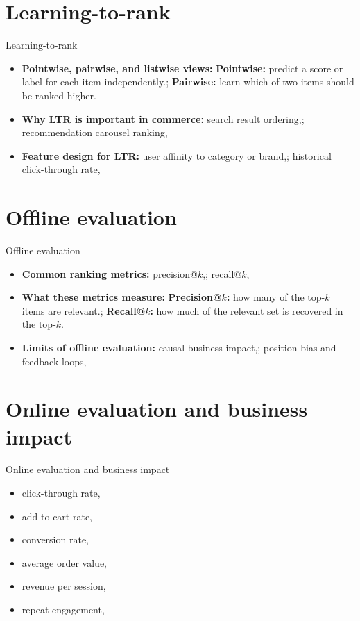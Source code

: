 \documentclass[aspectratio=169]{beamer}
\begin{document}
\section{Learning-to-rank}

\begin{frame}{Learning-to-rank}
  \begin{itemize}
    \item \textbf{Pointwise, pairwise, and listwise views:} \textbf{Pointwise:} predict a score or label for each item independently.; \textbf{Pairwise:} learn which of two items should be ranked higher.
    \item \textbf{Why LTR is important in commerce:} search result ordering,; recommendation carousel ranking,
    \item \textbf{Feature design for LTR:} user affinity to category or brand,; historical click-through rate,
  \end{itemize}
\end{frame}

\section{Offline evaluation}

\begin{frame}{Offline evaluation}
  \begin{itemize}
    \item \textbf{Common ranking metrics:} precision@$k$,; recall@$k$,
    \item \textbf{What these metrics measure:} \textbf{Precision@$k$:} how many of the top-$k$ items are relevant.; \textbf{Recall@$k$:} how much of the relevant set is recovered in the top-$k$.
    \item \textbf{Limits of offline evaluation:} causal business impact,; position bias and feedback loops,
  \end{itemize}
\end{frame}

\section{Online evaluation and business impact}

\begin{frame}{Online evaluation and business impact}
  \begin{itemize}
    \item click-through rate,
    \item add-to-cart rate,
    \item conversion rate,
    \item average order value,
    \item revenue per session,
    \item repeat engagement,
  \end{itemize}
\end{frame}
\end{document}
